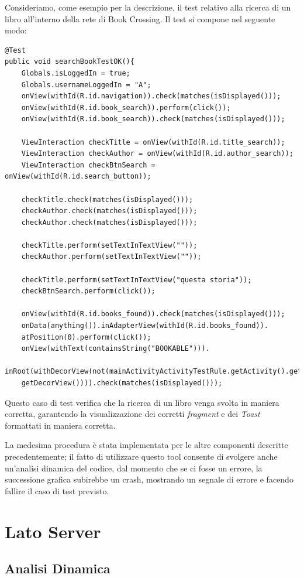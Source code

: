 Consideriamo, come esempio per la descrizione, il test relativo alla ricerca di un libro all'interno della rete di Book Crossing. Il test si compone nel seguente modo:
\begin{lstlisting}
@Test
public void searchBookTestOK(){
	Globals.isLoggedIn = true;
	Globals.usernameLoggedIn = "A";
	onView(withId(R.id.navigation)).check(matches(isDisplayed()));
	onView(withId(R.id.book_search)).perform(click());
	onView(withId(R.id.book_search)).check(matches(isDisplayed()));
	
	ViewInteraction checkTitle = onView(withId(R.id.title_search));
	ViewInteraction checkAuthor = onView(withId(R.id.author_search));
	ViewInteraction checkBtnSearch = onView(withId(R.id.search_button));
	
	checkTitle.check(matches(isDisplayed()));
	checkAuthor.check(matches(isDisplayed()));
	checkAuthor.check(matches(isDisplayed()));
	
	checkTitle.perform(setTextInTextView(""));
	checkAuthor.perform(setTextInTextView(""));
	
	checkTitle.perform(setTextInTextView("questa storia"));
	checkBtnSearch.perform(click());
	
	onView(withId(R.id.books_found)).check(matches(isDisplayed()));
	onData(anything()).inAdapterView(withId(R.id.books_found)).
	atPosition(0).perform(click());
	onView(withText(containsString("BOOKABLE"))).
	inRoot(withDecorView(not(mainActivityActivityTestRule.getActivity().getWindow().
	getDecorView()))).check(matches(isDisplayed()));
\end{lstlisting}

Questo caso di test verifica che la ricerca di un libro venga svolta in maniera corretta, garantendo la visualizzazione dei corretti \textit{fragment} e dei \textit{Toast} formattati in maniera corretta.

La medesima procedura è stata implementata per le altre componenti descritte precedentemente; il fatto di utilizzare questo tool consente di svolgere anche un'analisi dinamica del codice, dal momento che se ci fosse un errore, la successione grafica subirebbe un crash, mostrando un segnale di errore e facendo fallire il caso di test previsto.

\section{Lato Server}
	\subsection{Analisi Dinamica}
